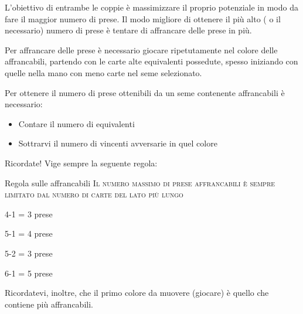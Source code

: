 \documentclass[../corsofiori.tex]{subfiles}
\begin{document}
L'obiettivo di entrambe le coppie è massimizzare il proprio potenziale in modo da fare il maggior numero di prese. Il
modo migliore di ottenere il più alto ( o il necessario) numero di prese è tentare di affrancare delle prese in più.

Per affrancare delle prese è necessario giocare ripetutamente nel colore delle affrancabili, partendo con le carte alte
equivalenti possedute, spesso iniziando con quelle nella mano con meno carte nel seme selezionato.

Per ottenere il numero di prese ottenibili da un seme contenente affrancabili è necessario:
\begin{itemize}
    \item Contare il numero di equivalenti
    \item Sottrarvi il numero di vincenti avversarie in quel colore
\end{itemize}

Ricordate! Vige sempre la seguente regola:

\begin{regola}{Regola sulle affrancabili}
    \textsc{Il numero massimo di prese affrancabili è sempre limitato dal numero di carte del lato più lungo}
\end{regola}
\bigskip

\begin{minipage}[h][3cm][t]{.23\linewidth}


    4-1 = 3 prese
\end{minipage}\hfill
\begin{minipage}[h][3cm][t]{.23\linewidth}


    5-1 = 4 prese
\end{minipage}\hfill
\begin{minipage}[h][3cm][t]{.23\linewidth}


    5-2 = 3 prese
\end{minipage}\hfill
\begin{minipage}[h][3cm][t]{.23\linewidth}


    6-1 = 5 prese
\end{minipage}

Ricordatevi, inoltre, che il primo colore da muovere (giocare) è quello che contiene più affrancabili.
\end{document}
